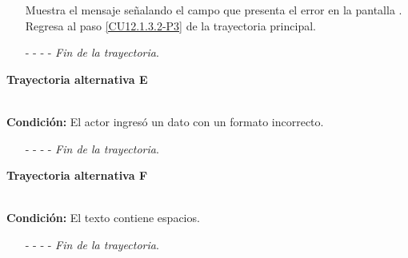 \begin{enumerate}
	\UCpaso[\UCsist] Muestra el mensaje  señalando el campo que presenta el error en la pantalla .
	\UCpaso Regresa al paso \ref{CU12.1.3.2-P3} de la trayectoria principal.
	\item[- -] - - {\em {Fin de la trayectoria}}.%
\end{enumerate}
\hypertarget{CU12-1-2-2:TAE}{\textbf{Trayectoria alternativa E}}\\
\noindent \textbf{Condición:} El actor ingresó un dato con un formato incorrecto.
\begin{enumerate}
	\UCpaso[\UCsist] Muestra el mensaje  señalando el campo que presenta el error en la pantalla .
	\UCpaso Regresa al paso \ref{CU12.1.2.2-P3} de la trayectoria principal.
	\item[- -] - - {\em {Fin de la trayectoria}}.
\end{enumerate}
\hypertarget{CU12-1-2-2:TAF}{\textbf{Trayectoria alternativa F}}\\
\noindent \textbf{Condición:} El texto contiene espacios.
\begin{enumerate}
	\UCpaso[\UCsist] Sustituye los espacios por guiones bajos.
	\UCpaso Continua en el \ref{CU12.1.2.2-TA1} de la trayectoria alternativa A.
	\item[- -] - - {\em {Fin de la trayectoria}}.
\end{enumerate}